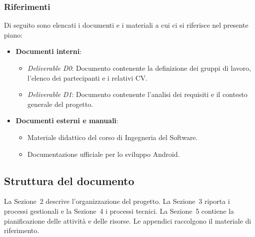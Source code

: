 \subsubsection*{Riferimenti}
Di seguito sono elencati i documenti e i materiali a cui ci si riferisce nel presente piano:

\begin{itemize}
    \item \textbf{Documenti interni}:
    \begin{itemize}
        \item \textit{Deliverable D0}: Documento contenente la definizione dei gruppi di lavoro, l'elenco dei partecipanti e i relativi CV.
        \item \textit{Deliverable D1}: Documento contenente l'analisi dei requisiti e il contesto generale del progetto.
    \end{itemize}
    \item \textbf{Documenti esterni e manuali}:
    \begin{itemize}
        \item Materiale didattico del corso di Ingegneria del Software.
        \item Documentazione ufficiale per lo sviluppo Android.
    \end{itemize}
\end{itemize}

\subsection{Struttura del documento}
La Sezione~2 descrive l'organizzazione del progetto. La Sezione~3 riporta i processi gestionali e la Sezione~4 i processi tecnici.
La Sezione~5 contiene la pianificazione delle attività e delle risorse. Le appendici raccolgono il materiale di riferimento.
